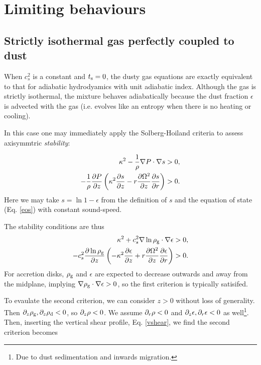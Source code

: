 \section{Limiting behaviours}

\subsection{Strictly isothermal gas perfectly coupled to dust}  
When $c_s^2$ is a constant and $t_\mathrm{s}=0$, the dusty gas equations are
exactly equivalent to that for adiabatic hydrodyamics with unit adiabatic
index. Although the gas is strictly isothermal, the mixture behaves 
adiabatically because the dust fraction $\epsilon$ is advected with
the gas (i.e. evolves like an entropy when there is no heating or
cooling). 

In this case one may immediately apply the Solberg-Hoiland
criteria to assess axisymmtric \emph{stability}:  

\begin{align}
  \kappa^2 - \frac{1}{\rho}\nabla P \cdot \nabla s &> 0,\\
  -\frac{1}{\rho}\frac{\partial P}{\partial z} \left(\kappa^2 \frac{\partial s}{\partial z} -
  r\frac{\partial\Omega^2}{\partial z}\frac{\partial s}{\partial r}\right) &>0. 
\end{align}  
Here we may take $s=\ln{1-\epsilon}$ from the definition of $s$ and
the equation of state (Eq. \ref{eos}) with constant sound-speed. 




The stability conditions are thus
\begin{align}
  \kappa^2 + c_s^2 \nabla\ln{\rho_\mathrm{g}}\cdot\nabla\epsilon &> 0,  \\
  -c_s^2\frac{\partial\ln{\rho_\mathrm{g}}}{\partial z}\left(-\kappa^2\frac{\partial\epsilon}{\partial
    z} + r\frac{\partial\Omega^2}{\partial z}\frac{\partial \epsilon}{\partial r} \right) & > 0. 
\end{align}
For accretion disks, $\rho_\mathrm{g}$ and $\epsilon$ are expected to decrease
outwards and away from the midplane, implying 
$\nabla\rho_\mathrm{g}\cdot\nabla\epsilon>0$, so the first criterion is
typically satisifed. 

To evaulate the second criterion, we can consider $z>0$ without loss
of generality. Then $\partial_z\rho_\mathrm{g},\partial_z\rho_\mathrm{d} <0$, so $\partial_z\rho<0$. We
assume $\partial_r\rho <0$ and $\partial_z\epsilon, \partial_r\epsilon <0$ as
well\footnote{Due to dust sedimentation and inwards migration.}. Then,
inserting the vertical shear profile, Eq. \ref{vshear}, we find the
second criterion becomes   

